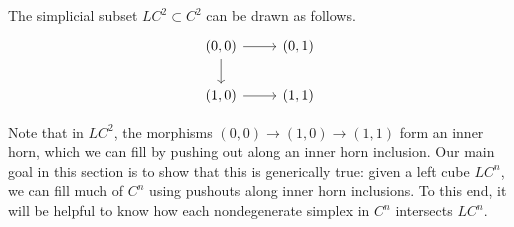 \documentclass[main.tex]{subfiles}
\begin{document}
\begin{example}
  The simplicial subset $LC^{2} \subset C^{2}$ can be drawn as follows.
  \begin{equation*}
    \begin{tikzcd}
      {(0, 0)}
      \arrow[r]
      \arrow[d]
      & {(0, 1)}
      \\
      {(1, 0)}
      \arrow[r]
      & {(1, 1)}
    \end{tikzcd}
  \end{equation*}
\end{example}

Note that in $LC^{2}$, the morphisms $(0,0) \to (1, 0) \to (1, 1)$ form an inner horn, which we can fill by pushing out along an inner horn inclusion. Our main goal in this section is to show that this is generically true: given a left cube $LC^{n}$, we can fill much of $C^{n}$ using pushouts along inner horn inclusions. To this end, it will be helpful to know how each nondegenerate simplex in $C^{n}$ intersects $LC^{n}$.
\end{document}
